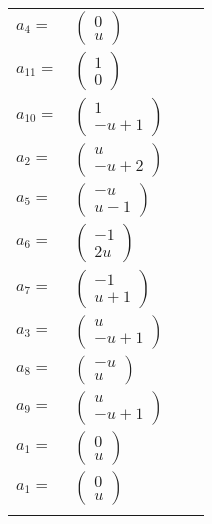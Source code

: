 \documentclass[1p]{elsarticle_modified}
\theoremstyle{definition}
\begin{document}
\begin{tabular}{m{7pt} m{180pt} m{7pt} m{180pt} }
\flushright $a_{4}=$&$\begin{pmatrix}0\\u\end{pmatrix}$ \\
\flushright $a_{11}=$&$\begin{pmatrix}1\\0\end{pmatrix}$ \\
\flushright $a_{10}=$&$\begin{pmatrix}1\\- u+1\end{pmatrix}$ \\
\flushright $a_{2}=$&$\begin{pmatrix}u\\- u+2\end{pmatrix}$ \\
\flushright $a_{5}=$&$\begin{pmatrix}- u\\u-1\end{pmatrix}$ \\
\flushright $a_{6}=$&$\begin{pmatrix}-1\\2 u\end{pmatrix}$ \\
\flushright $a_{7}=$&$\begin{pmatrix}-1\\u+1\end{pmatrix}$ \\
\flushright $a_{3}=$&$\begin{pmatrix}u\\- u+1\end{pmatrix}$ \\
\flushright $a_{8}=$&$\begin{pmatrix}- u\\u\end{pmatrix}$ \\
\flushright $a_{9}=$&$\begin{pmatrix}u\\- u+1\end{pmatrix}$ \\
\flushright $a_{1}=$&$\begin{pmatrix}0\\u\end{pmatrix}$\\ \flushright $a_{1}=$&$\begin{pmatrix}0\\u\end{pmatrix}$\\&\end{tabular}
\end{document}
